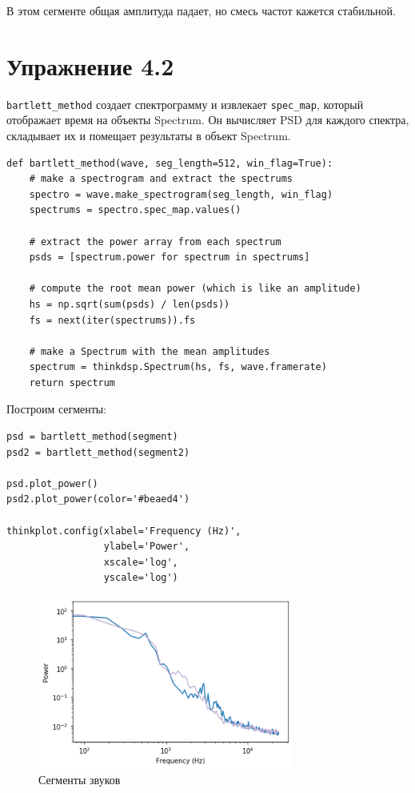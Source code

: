 \documentclass[a4paper,12pt]{report}
\begin{document}
В этом сегменте общая амплитуда падает, но смесь частот кажется стабильной.

\chapter{Упражнение 4.2}

\texttt{bartlett\_method} создает спектрограмму и извлекает \texttt{spec\_map}, который отображает время на объекты Spectrum. Он вычисляет PSD для каждого спектра, складывает их и помещает результаты в объект Spectrum.

\begin{lstlisting}[caption=Функция bartlett\_method]
def bartlett_method(wave, seg_length=512, win_flag=True):
    # make a spectrogram and extract the spectrums
    spectro = wave.make_spectrogram(seg_length, win_flag)
    spectrums = spectro.spec_map.values()
    
    # extract the power array from each spectrum
    psds = [spectrum.power for spectrum in spectrums]
    
    # compute the root mean power (which is like an amplitude)
    hs = np.sqrt(sum(psds) / len(psds))
    fs = next(iter(spectrums)).fs
    
    # make a Spectrum with the mean amplitudes
    spectrum = thinkdsp.Spectrum(hs, fs, wave.framerate)
    return spectrum
\end{lstlisting}

Построим сегменты:

\begin{lstlisting}[caption=Сегменты звуков]
psd = bartlett_method(segment)
psd2 = bartlett_method(segment2)

psd.plot_power()
psd2.plot_power(color='#beaed4')

thinkplot.config(xlabel='Frequency (Hz)', 
                 ylabel='Power', 
                 xscale='log', 
                 yscale='log')
\end{lstlisting}

\begin{figure}[H]
        \centering
        \includegraphics[width=0.75\textwidth]{lab4_fig2_1.png}
        \caption{Сегменты звуков}
        \label{fig:lab4_fig2_1}
\end{figure}
\end{document}
